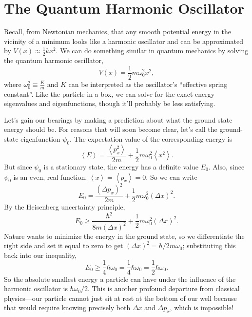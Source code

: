\documentclass[../p052main.tex]{subfiles}
\begin{document}
\section{The Quantum Harmonic Oscillator}
Recall, from Newtonian mechanics, that any smooth potential energy in the vicinity of a minimum looks like a harmonic oscillator and can be approximated by $V(x) \approx \frac{1}{2} kx^2$.
We can do something similar in quantum mechanics by solving the quantum harmonic oscillator,
\[ V(x) = \frac{1}{2}m \omega_0^2 x^2, \]
where $\omega_0^2 \equiv \frac{K}{m}$ and $K$ can be interpreted as the oscillator's ``effective spring constant''.
Like the particle in a box, we can solve for the exact energy eigenvalues and eigenfunctions, though it'll probably be less satisfying.

Let's gain our bearings by making a prediction about what the ground state energy should be.
For reasons that will soon become clear, let's call the ground-state eigenfunction $\psi_0$.
The expectation value of the corresponding energy is
\[ \left< E \right> = \frac{\left< p_x^2 \right>}{2m} + \frac{1}{2}m\omega_0^2 \left< x^2 \right>. \]
But since $\psi_0$ is a stationary state, the energy has a definite value $E_0$.
Also, since $\psi_0$ is an even, real function, $\left< x \right> = \left< p_x \right> = 0$.
So we can write
\[ E_0 = \frac{(\Delta p_x)^2}{2m} + \frac{1}{2}m\omega_0^2 (\Delta x)^2. \]
By the Heisenberg uncertainty principle,
\[ E_0 \geq \frac{\hbar^2}{8m (\Delta x)^2} + \frac{1}{2} m\omega_0^2 (\Delta x)^2. \]
Nature wants to minimize the energy in the ground state, so we differentiate the right side and set it equal to zero to get $(\Delta x)^2 = \hbar / 2m\omega_0$; substituting this back into our inequality,
\[ E_0 \geq \frac{1}{4} \hbar \omega_0 = \frac{1}{4} \hbar \omega_0 = \frac{1}{2} \hbar \omega_0. \]
So the absolute smallest energy a particle can have under the influence of the harmonic oscillator is $\hbar \omega_0 / 2$.
This is another profound departure from classical physics---our particle cannot just sit at rest at the bottom of our well because that would require knowing precisely both $\Delta x$ and $\Delta p_x$, which is impossible!
\end{document}
